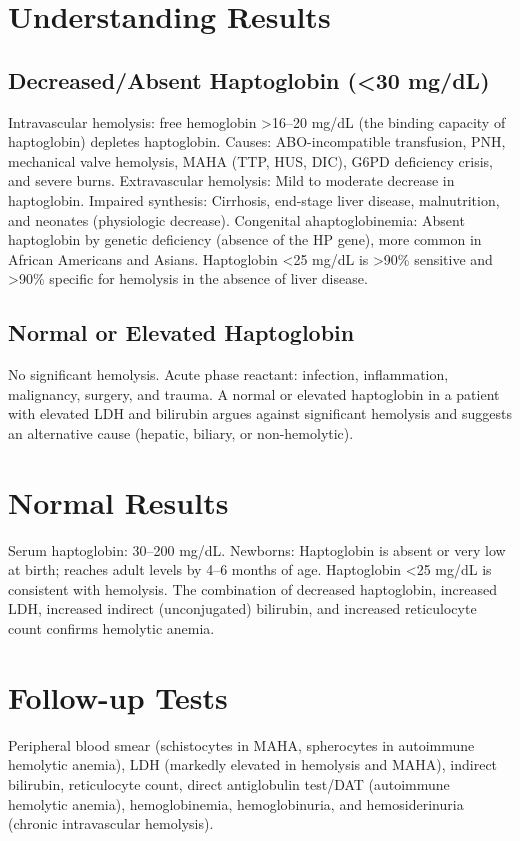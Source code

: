 \section*{Understanding Results}
\subsection*{Decreased/Absent Haptoglobin (<30 mg/dL)}
Intravascular hemolysis: free hemoglobin >16--20 mg/dL (the binding capacity of haptoglobin) depletes haptoglobin. Causes: ABO-incompatible transfusion, PNH, mechanical valve hemolysis, MAHA (TTP, HUS, DIC), G6PD deficiency crisis, and severe burns. Extravascular hemolysis: Mild to moderate decrease in haptoglobin. Impaired synthesis: Cirrhosis, end-stage liver disease, malnutrition, and neonates (physiologic decrease). Congenital ahaptoglobinemia: Absent haptoglobin by genetic deficiency (absence of the HP gene), more common in African Americans and Asians. Haptoglobin <25 mg/dL is >90\% sensitive and >90\% specific for hemolysis in the absence of liver disease.
\subsection*{Normal or Elevated Haptoglobin}
No significant hemolysis. Acute phase reactant: infection, inflammation, malignancy, surgery, and trauma. A normal or elevated haptoglobin in a patient with elevated LDH and bilirubin argues against significant hemolysis and suggests an alternative cause (hepatic, biliary, or non-hemolytic).
\section*{Normal Results}
Serum haptoglobin: 30--200 mg/dL. Newborns: Haptoglobin is absent or very low at birth; reaches adult levels by 4--6 months of age. Haptoglobin <25 mg/dL is consistent with hemolysis. The combination of decreased haptoglobin, increased LDH, increased indirect (unconjugated) bilirubin, and increased reticulocyte count confirms hemolytic anemia.
\section*{Follow-up Tests}
Peripheral blood smear (schistocytes in MAHA, spherocytes in autoimmune hemolytic anemia), LDH (markedly elevated in hemolysis and MAHA), indirect bilirubin, reticulocyte count, direct antiglobulin test/DAT (autoimmune hemolytic anemia), hemoglobinemia, hemoglobinuria, and hemosiderinuria (chronic intravascular hemolysis).
